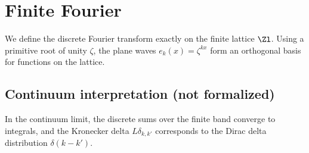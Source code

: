 \chapter{Finite Fourier}
We define the discrete Fourier transform exactly on the finite lattice $\Zl$. Using a primitive root of unity $\zeta$, the plane waves $e_k(x) = \zeta^{kx}$ form an orthogonal basis for functions on the lattice.

\section{Continuum interpretation (not formalized)}
In the continuum limit, the discrete sums over the finite band converge to integrals, and the Kronecker delta $L \delta_{k, k'}$ corresponds to the Dirac delta distribution $\delta(k - k')$.
